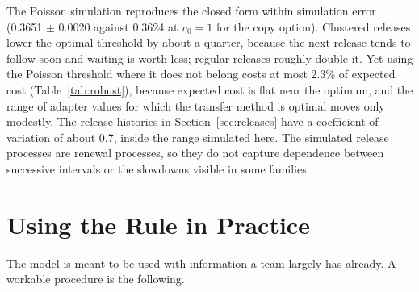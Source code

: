 \documentclass[ijds,nonblindrev]{informs4}
\begin{document}
The Poisson simulation reproduces the closed form within simulation error (0.3651 $\pm$ 0.0020 against 0.3624 at $v_0=1$ for the copy option). Clustered releases lower the optimal threshold by about a quarter, because the next release tends to follow soon and waiting is worth less; regular releases roughly double it. Yet using the Poisson threshold where it does not belong costs at most 2.3\% of expected cost (Table~\ref{tab:robust}), because expected cost is flat near the optimum, and the range of adapter values for which the transfer method is optimal moves only modestly. The release histories in Section~\ref{sec:releases} have a coefficient of variation of about 0.7, inside the range simulated here. The simulated release processes are renewal processes, so they do not capture dependence between successive intervals or the slowdowns visible in some families.

\section{Using the Rule in Practice}\label{sec:practice}

The model is meant to be used with information a team largely has already. A workable procedure is the following.
\end{document}
